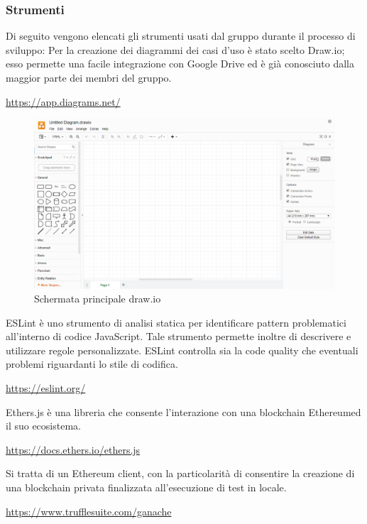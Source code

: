 \subsubsection{Strumenti}
	Di seguito vengono elencati gli strumenti usati dal gruppo durante il processo di sviluppo:
	Per la creazione dei diagrammi dei casi d'uso è stato scelto Draw.io; esso permette  una facile integrazione con Google Drive ed è già conosciuto dalla maggior parte dei membri del gruppo.
	\begin{center}
		\url{https://app.diagrams.net/}
	\end{center}
	\begin{figure}[h!]
		\centering
		\includegraphics[scale=0.62]{./res/img/draw.png}
		\caption{Schermata principale draw.io}
	\end{figure}

	ESLint è uno strumento di analisi statica per identificare pattern problematici all'interno di codice JavaScript. Tale strumento permette inoltre di descrivere e utilizzare regole personalizzate. ESLint controlla sia la code quality che eventuali problemi riguardanti lo stile di codifica.
	\begin{center}
		\url{https://eslint.org/}
	\end{center}

	Ethers.js è una libreria che consente l'interazione con una blockchain Ethereumed il suo ecosistema.
	\begin{center}
		\url{https://docs.ethers.io/ethers.js}
	\end{center}

	Si tratta di un Ethereum client, con la particolarità di consentire la creazione di una blockchain privata finalizzata all'esecuzione di test in locale.
	\begin{center}
		\url{https://www.trufflesuite.com/ganache}
	\end{center}

